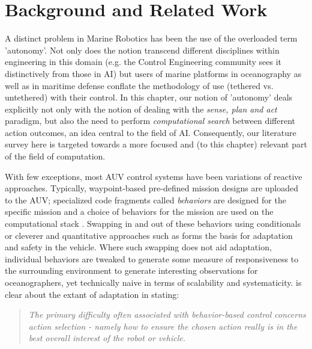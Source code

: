 \section{Background and Related Work}
\label{sec:related}


A distinct problem in Marine Robotics has been the use of the
overloaded term 'autonomy'. Not only does the notion transcend
different disciplines within engineering in this domain (e.g. the
Control Engineering community sees it distinctively from those in AI)
but users of marine platforms in oceanography as well as in maritime
defense conflate the methodology of use (tethered vs. untethered) with
their control. In this chapter, our notion of 'autonomy' deals
explicitly not only with the notion of dealing with the \emph{sense,
  plan and act} paradigm, but also the need to perform
\emph{computational search} between different action outcomes, an idea
central to the field of AI. Consequently, our literature survey here
is targeted towards a more focused and (to this chapter) relevant part
of the field of computation.

With few exceptions, most AUV control systems have been variations of
reactive approaches.  Typically, waypoint-based pre-defined mission
designs are uploaded to the AUV; specialized code fragments called
\emph{behaviors} are designed for the specific mission and a choice of
behaviors for the mission are used on the computational stack
\cite{bellingham94}. Swapping in and out of these behaviors using
conditionals or cleverer and quantitative approaches such as
\cite{Benjamin:2004} forms the basis for adaptation and safety in the
vehicle. Where such swapping does not aid adaptation, individual
behaviors are tweaked to generate some measure of responsiveness to
the surrounding environment \cite{yanwu08} to generate interesting
observations for oceanographers, yet technically naive in terms of
scalability and systematicity. \cite{Benjamin2006} is clear about the
extant of adaptation in stating:

{\footnotesize
  \begin{quote}
\small \emph{The primary difficulty often associated with behavior-based control
concerns action selection - namely how to ensure the chosen action
really is in the best overall interest of the robot or vehicle.}
\end{quote}
} 

